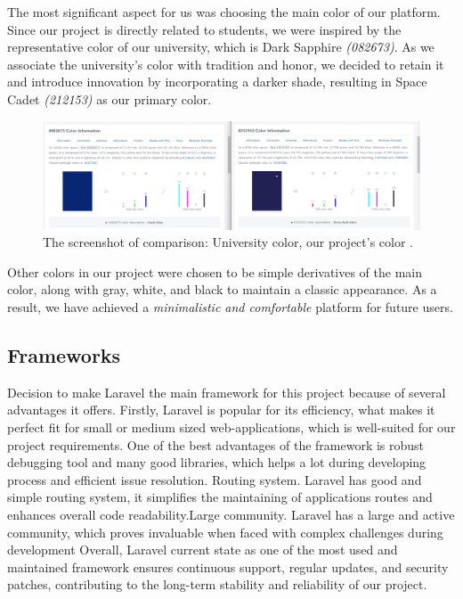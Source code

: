 The most significant aspect for us was choosing the main color of our platform. Since our project is directly related to students, we were inspired by the representative color of our university, which is Dark Sapphire \textit{(082673)}. As we associate the university's color with tradition and honor, we decided to retain it and introduce innovation by incorporating a darker shade, resulting in Space Cadet \textit{(212153)} as our primary color. 

\begin{figure}[ht]\label{fig:colors}
  \centering
  \includegraphics[width=0.8\linewidth]{figures/color comparison.jpg}
  \caption{The screenshot of comparison: University color, our project's color .}
\end{figure}

Other colors in our project were chosen to be simple derivatives of the main color, along with gray, white, and black to maintain a classic appearance. As a result, we have achieved a \textit{minimalistic and comfortable} platform for future users.

\subsection{Frameworks}\label{frmw}
Decision to make Laravel \cite{laravel} the main framework for this project because of several advantages it offers. Firstly, Laravel \cite{laravel} is popular for its efficiency, what makes it perfect fit for small or medium sized web-applications, which is well-suited for our project requirements. One of the best advantages of the framework is robust debugging tool and many good libraries, which helps a lot during developing process and efficient issue resolution.
Routing system. Laravel \cite{laravel} has good and simple routing system, it simplifies the maintaining of applications routes and enhances overall code readability.Large community. Laravel \cite{laravel} has a large and active community, which proves invaluable when faced with complex challenges during development
Overall, Laravel \cite{laravel} current state as one of the most used and maintained framework ensures continuous support, regular updates, and security patches, contributing to the long-term stability and reliability of our project.
\par

